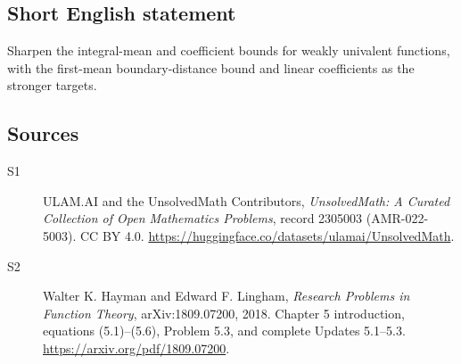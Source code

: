 \documentclass[11pt]{book}
\begin{document}
\subsection{Short English statement}
Sharpen the integral-mean and coefficient bounds for weakly univalent functions, with the first-mean boundary-distance bound and linear coefficients as the stronger targets.
\subsection{Sources}
\begin{description}
\item[\hypertarget{source:2305003:1}{S1}] ULAM.AI and the UnsolvedMath Contributors, \emph{UnsolvedMath: A Curated Collection of Open Mathematics Problems}, record 2305003 (AMR-022-5003). CC BY 4.0. \url{https://huggingface.co/datasets/ulamai/UnsolvedMath}.
\item[\hypertarget{source:2305003:2}{S2}] Walter K. Hayman and Edward F. Lingham, \emph{Research Problems in Function Theory}, arXiv:1809.07200, 2018. Chapter 5 introduction, equations (5.1)--(5.6), Problem 5.3, and complete Updates 5.1--5.3. \url{https://arxiv.org/pdf/1809.07200}.
\end{description}
\label{end:2305003}
\end{document}

